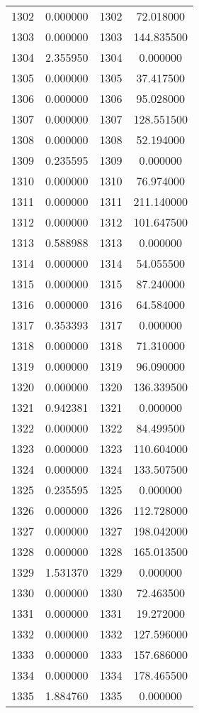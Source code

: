 \documentclass[12pt]{article}
\begin{document}
\begin{longtable}{@{}cccc@{}}
1302 & 0.000000 & 1302 & 72.018000 \\
1303 & 0.000000 & 1303 & 144.835500 \\
1304 & 2.355950 & 1304 & 0.000000 \\
1305 & 0.000000 & 1305 & 37.417500 \\
1306 & 0.000000 & 1306 & 95.028000 \\
1307 & 0.000000 & 1307 & 128.551500 \\
1308 & 0.000000 & 1308 & 52.194000 \\
1309 & 0.235595 & 1309 & 0.000000 \\
1310 & 0.000000 & 1310 & 76.974000 \\
1311 & 0.000000 & 1311 & 211.140000 \\
1312 & 0.000000 & 1312 & 101.647500 \\
1313 & 0.588988 & 1313 & 0.000000 \\
1314 & 0.000000 & 1314 & 54.055500 \\
1315 & 0.000000 & 1315 & 87.240000 \\
1316 & 0.000000 & 1316 & 64.584000 \\
1317 & 0.353393 & 1317 & 0.000000 \\
1318 & 0.000000 & 1318 & 71.310000 \\
1319 & 0.000000 & 1319 & 96.090000 \\
1320 & 0.000000 & 1320 & 136.339500 \\
1321 & 0.942381 & 1321 & 0.000000 \\
1322 & 0.000000 & 1322 & 84.499500 \\
1323 & 0.000000 & 1323 & 110.604000 \\
1324 & 0.000000 & 1324 & 133.507500 \\
1325 & 0.235595 & 1325 & 0.000000 \\
1326 & 0.000000 & 1326 & 112.728000 \\
1327 & 0.000000 & 1327 & 198.042000 \\
1328 & 0.000000 & 1328 & 165.013500 \\
1329 & 1.531370 & 1329 & 0.000000 \\
1330 & 0.000000 & 1330 & 72.463500 \\
1331 & 0.000000 & 1331 & 19.272000 \\
1332 & 0.000000 & 1332 & 127.596000 \\
1333 & 0.000000 & 1333 & 157.686000 \\
1334 & 0.000000 & 1334 & 178.465500 \\
1335 & 1.884760 & 1335 & 0.000000 \\

\end{longtable}
\end{document}
